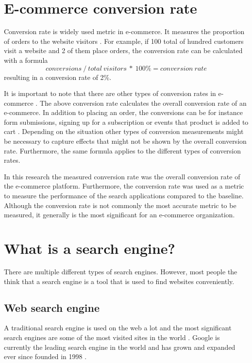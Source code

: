 \section{E-commerce conversion rate}

Conversion rate is widely used metric in e-commerce.
It measures the proportion of orders to the website visitors \cite{conversionRate}.
For example, if 100 total of hundred customers visit a website and 2 of them place orders, 
the conversion rate can be calculated with a formula
\begin{equation} 
    \label{eq:conversion}
    conversions\ /\ total\ visitors\ *\ 100\% = conversion\ rate
\end{equation}
resulting in a conversion rate of 2\%.

It is important to note that there are other types of conversion rates in e-commerce \cite{conversionRate}.
The above conversion rate calculates the overall conversion rate of an e-commerce.
In addition to placing an order, the conversions can be for instance form submissions, signing up for a subscription 
or events that product is added to cart \cite{conversionRateWhat}.
Depending on the situation other types of conversion measurements might be necessary 
to capture effects that might not be shown by the overall conversion rate.
Furthermore, the same formula applies to the different types of conversion rates.

In this research the measured conversion rate was the overall conversion rate of the e-commerce platform.
Furthermore, the conversion rate was used as a metric to measure the performance of the search applications
compared to the baseline.
Although the conversion rate is not commonly the most accurate metric to be measured, 
it generally is the most significant for an e-commerce organization.



\section{What is a search engine?}
There are multiple different types of search engines. However, most people the think that a search engine is a tool that is used to find websites conveniently.



\subsection{Web search engine}
A traditional search engine is used on the web a lot and the most significant search engines are some of the most visited sites in the world \cite{alexa}.
Google is currently the leading search engine in the world and has grown and expanded ever since founded in 1998 \cite{googleInit}.



